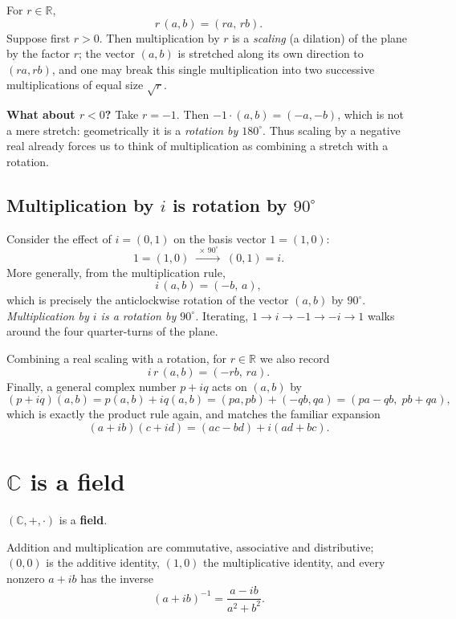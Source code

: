 \documentclass[11pt,openany]{report}
\newcommand{\C}{\mathbb{C}}
\newcommand{\R}{\mathbb{R}}
\begin{document}
For $r\in\R$,
\[
  r\,(a,b) = (ra,\,rb).
\]
Suppose first $r>0$. Then multiplication by $r$ is a \emph{scaling} (a dilation) of the
plane by the factor $r$; the vector $(a,b)$ is stretched along its own direction to
$(ra,rb)$, and one may break this single multiplication into two successive
multiplications of equal size $\sqrt r$.

\begin{caution}
\textbf{What about $r<0$?} Take $r=-1$. Then $-1\cdot(a,b) = (-a,-b)$, which is not a
mere stretch: geometrically it is a \emph{rotation by $180^\circ$}. Thus scaling by a
negative real already forces us to think of multiplication as combining a stretch with a
rotation.
\end{caution}

\subsection{Multiplication by \texorpdfstring{$i$}{i} is rotation by \texorpdfstring{$90^\circ$}{90 degrees}}

Consider the effect of $i=(0,1)$ on the basis vector $1=(1,0)$:
\[
  1=(1,0) \;\xrightarrow{\ \times\, 90^\circ\ }\; (0,1) = i.
\]
More generally, from the multiplication rule,
\[
  i\,(a,b) = (-b,\,a),
\]
which is precisely the anticlockwise rotation of the vector $(a,b)$ by $90^\circ$.
\emph{Multiplication by $i$ is a rotation by $90^\circ$.} Iterating, $1\to i\to -1\to -i\to 1$
walks around the four quarter-turns of the plane.

Combining a real scaling with a rotation, for $r\in\R$ we also record
\[
  i\,r\,(a,b) = (-rb,\, ra).
\]
Finally, a general complex number $p+iq$ acts on $(a,b)$ by
\[
  (p+iq)(a,b) = p(a,b) + iq(a,b) = (pa,pb)+(-qb,qa) = (pa-qb,\; pb+qa),
\]
which is exactly the product rule again, and matches the familiar expansion
\[
  (a+ib)(c+id) = (ac-bd) + i(ad+bc).
\]

\section{\texorpdfstring{$\C$}{C} is a field}

\begin{keybox}
\centering
$(\C,+,\cdot)$ is a \textbf{field}.
\end{keybox}

Addition and multiplication are commutative, associative and distributive; $(0,0)$ is the
additive identity, $(1,0)$ the multiplicative identity, and every nonzero $a+ib$ has the
inverse
\[
  (a+ib)^{-1} = \frac{a-ib}{a^2+b^2}.
\]
\end{document}
